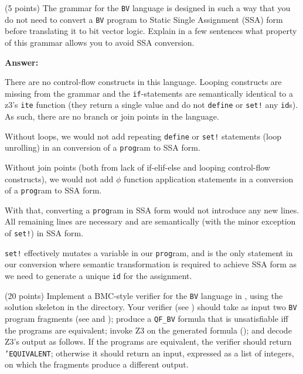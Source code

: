 \documentclass{handout}
\begin{document}
\begin{questions}

\item (5 points) \label{prob:bvv:first} The grammar for the \texttt{BV} language
is designed in such a way that you do not need to convert a \texttt{BV} program
to Static Single Assignment (SSA) form before translating it to bit vector
logic.  Explain in a few sentences what property of this grammar allows you to
avoid SSA conversion.

\textbf{Answer:}

There are no control-flow constructs in this language. Looping constructs are
missing from the grammar and the \texttt{if}-statements are semantically
identical to a z3's \texttt{ite} function (they return a single value and do not
\texttt{define} or \texttt{set!} any \texttt{id}s). As such, there are no branch
or join points in the language.

Without loops, we would not add repeating \texttt{define} or \texttt{set!}
statements (loop unrolling) in an conversion of a \texttt{prog}ram to SSA form.

Without join points (both from lack of if-elif-else and looping control-flow
constructs), we would not add $\phi$ function application statements in a
conversion of a \texttt{prog}ram to SSA form.

With that, converting a \texttt{prog}ram in SSA form would not introduce any new
lines. All remaining lines are necessary and are semantically (with the minor
exception of \texttt{set!}) in SSA form.

\texttt{set!} effectively mutates a variable in our \texttt{prog}ram, and is the
only statement in our conversion where semantic transformation is required to
achieve SSA form as we need to generate a unique \texttt{id} for the assignment.

\item (20 points) \label{prob:bvv:last} Implement a BMC-style verifier for the
\texttt{BV} language in \racket, using the solution skeleton in the 
directory. Your verifier (see ) should take as input two
\texttt{BV} program fragments (see  and
); produce a  \texttt{QF\_BV} formula that is unsatisfiable
iff  the programs are equivalent; invoke Z3 on the generated formula
(); and decode Z3's output as follows.  If the programs
are equivalent, the verifier should return \texttt{'EQUIVALENT}; otherwise it
should return an input, expressed as a list of integers, on which the fragments
produce a different output.


\end{questions}
\end{document}
